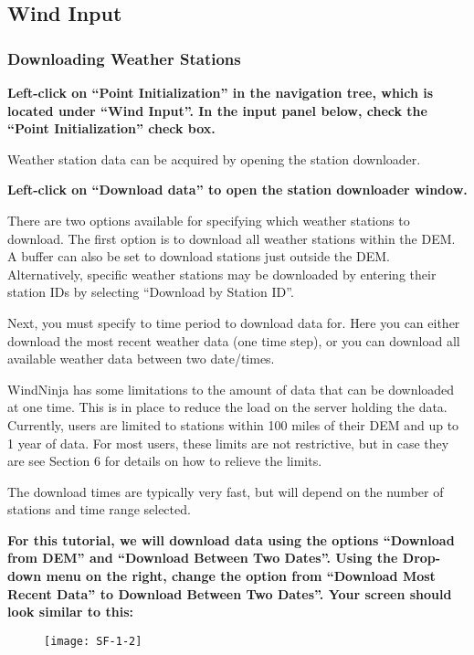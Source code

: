 \documentclass[12pt]{article}
\begin{document}
\subsection{Wind Input}
\subsubsection{Downloading Weather Stations}

\textbf{\color{red} Left-click on “Point Initialization” in the navigation tree, which is located under “Wind Input”.  In the input panel below, check the “Point Initialization” check box.}

Weather station data can be acquired by opening the station downloader.

\textbf{\color{red}Left-click on “Download data” to open the station downloader window.}

There are two options available for specifying which weather stations to download. The first option is to download all weather stations within the DEM. A buffer can also be set to download stations just outside the DEM. Alternatively, specific weather stations may be downloaded by entering their station IDs by selecting “Download by Station ID”.

Next, you must specify to time period to download data for.  Here you can either download the most recent weather data (one time step), or you can download all available weather data between two date/times.

WindNinja has some limitations to the amount of data that can be downloaded at one time.  This is in place to reduce the load on the server holding the data.  Currently, users are limited to stations within 100 miles of their DEM and up to 1 year of data.  For most users, these limits are not restrictive, but in case they are see Section 6 for details on how to relieve the limits.

The download times are typically very fast, but will depend on the number of stations and time range selected.

\textbf{\color{red}For this tutorial, we will download data using the options “Download from DEM” and “Download Between Two Dates”. Using the Drop-down menu on the right, change the option from “Download Most Recent Data” to Download Between Two Dates”. Your screen should look similar to this:}

\begin{figure}[H]
	\centering
	\label{}
	\texttt{[image: SF-1-2]}
\end{figure}
\end{document}

